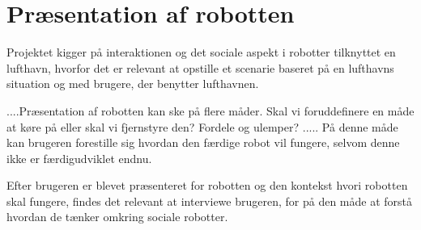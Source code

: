\section{Præsentation af robotten}
%
Projektet kigger på interaktionen og det sociale aspekt i robotter tilknyttet en lufthavn, hvorfor det er relevant at opstille et scenarie baseret på en lufthavns situation og med brugere, der benytter lufthavnen.\blankline


....Præsentation af robotten kan ske på flere måder. Skal vi foruddefinere en måde at køre på eller skal vi fjernstyre den? Fordele og ulemper? ..... På denne måde kan brugeren forestille sig hvordan den færdige robot vil fungere, selvom denne ikke er færdigudviklet endnu.\blankline


Efter brugeren er blevet præsenteret for robotten og den kontekst hvori robotten skal fungere, findes det relevant at interviewe brugeren, for på den måde at forstå hvordan de tænker omkring sociale robotter.
